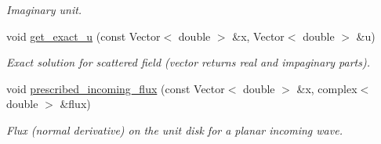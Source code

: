 \begin{DoxyCompactItemize}
\begin{DoxyCompactList}\small\item\em Imaginary unit. \end{DoxyCompactList}\item 
void \hyperlink{namespaceGlobalParameters_ae2320da6053f5527b2af5ebb362a8a07}{get\+\_\+exact\+\_\+u} (const Vector$<$ double $>$ \&x, Vector$<$ double $>$ \&u)
\begin{DoxyCompactList}\small\item\em Exact solution for scattered field (vector returns real and impaginary parts). \end{DoxyCompactList}\item 
void \hyperlink{namespaceGlobalParameters_a5183de63b992338ee60bb4da78a45039}{prescribed\+\_\+incoming\+\_\+flux} (const Vector$<$ double $>$ \&x, complex$<$ double $>$ \&flux)
\begin{DoxyCompactList}\small\item\em Flux (normal derivative) on the unit disk for a planar incoming wave. \end{DoxyCompactList}\end{DoxyCompactItemize}
